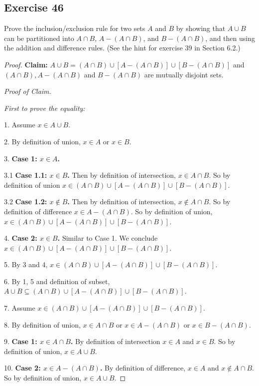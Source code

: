 \documentclass[14pt]{extarticle}
\begin{document}
\subsection{Exercise 46}
Prove the inclusion/exclusion rule for two sets $A$ and $B$ by showing that \(A \cup B\) can be partitioned into 
\(A \cap B\), \(A - (A \cap B)\), and \(B - (A \cap B)\), and then using the addition and difference rules. 
(See the hint for exercise 39 in Section 6.2.)

\begin{proof}
{\bf Claim:} \(A \cup B = (A \cap B) \cup [A - (A \cap B)] \cup [B - (A \cap B)]\) and \((A \cap B), A-(A \cap B)\) 
and \(B-(A \cap B)\) are mutually disjoint sets.

{\it Proof of Claim.} 

{\it First to prove the equality:}

1. Assume \(x \in A \cup B\). 

2. By definition of union, \(x \in A\) or \(x \in B\).

3. {\bf Case 1: \(x \in A\).}

3.1 {\bf Case 1.1: \(x \in B\).} Then by definition of intersection, \(x \in A \cap B\). So by definition of union
\(x \in (A \cap B) \cup [A - (A \cap B)] \cup [B - (A \cap B)]\).

3.2 {\bf Case 1.2: \(x \notin B\).} Then by definition of intersection, \(x \notin A \cap B\). So by definition of 
difference \(x \in A - (A \cap B)\). So by definition of union, \(x \in (A \cap B) \cup [A - (A \cap B)] \cup 
[B - (A \cap B)]\).

4. {\bf Case 2: \(x \in B\).} Similar to Case 1. We conclude \(x \in (A \cap B) \cup [A - (A \cap B)] \cup 
[B - (A \cap B)]\).

5. By 3 and 4, \(x \in (A \cap B) \cup [A - (A \cap B)] \cup [B - (A \cap B)]\).

6. By 1, 5 and definition of subset, \(A \cup B \subseteq (A \cap B) \cup [A - (A \cap B)] \cup [B - (A \cap B)]\).

7. Assume \(x \in (A \cap B) \cup [A - (A \cap B)] \cup 
[B - (A \cap B)]\).

8. By definition of union, \(x \in A \cap B\) or \(x \in A - (A \cap B)\) or \(x \in B - (A \cap B)\).

9. {\bf Case 1: \(x \in A \cap B\).} By definition of intersection \(x \in A\) and \(x \in B\). So by definition
of union, \(x \in A \cup B\).

10. {\bf Case 2: \(x \in A - (A \cap B)\).} By definition of difference, \(x \in A\) and \(x \notin A \cap B\). So by 
definition of union, \(x \in A \cup B\).


\end{proof}
\end{document}
